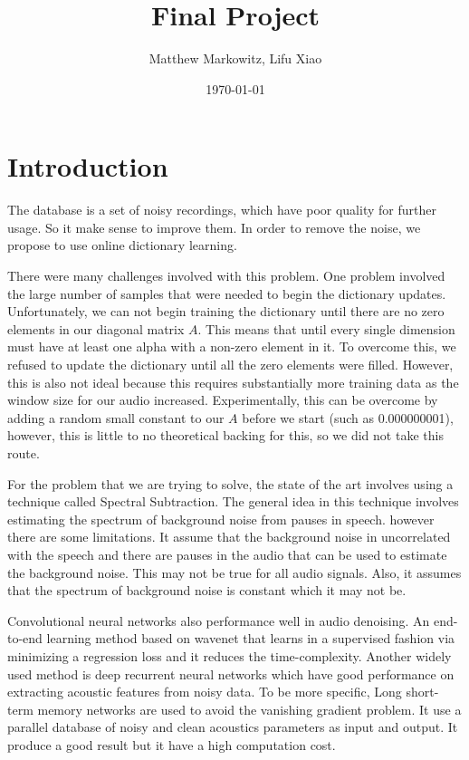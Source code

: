 \documentclass[UTF8]{article}
\title{Final Project}
\author{Matthew Markowitz, Lifu Xiao}
\date{\today}
\begin{document}
\maketitle


\section{Introduction}
The database is a set of noisy recordings, which have poor quality for further usage. So it make sense  to improve them. In order to remove the noise, we propose to use online dictionary learning.


There were many challenges involved with this problem. One problem involved the large number of samples that were needed to begin the dictionary updates. Unfortunately, we can not begin training the dictionary until there are no zero elements in our diagonal matrix $A$. This means that until every single dimension must have at least one alpha with a non-zero element in it. To overcome this, we refused to update the dictionary until all the zero elements were filled. However, this is also not ideal because this requires substantially more training data as the window size for our audio increased. Experimentally, this can be overcome by adding a random small constant to our $A$ before we start (such as 0.000000001), however, this is little to no theoretical backing for this, so we did not take this route.


For the problem that we are trying to solve, the state of the art involves using a technique called Spectral Subtraction\cite{upadhyay2015speech}. The general idea in this technique involves estimating the spectrum of background noise from pauses in speech. however there are some limitations. It assume that the background noise in uncorrelated with the speech and there are pauses in the audio that can be used to estimate the background noise. This may not be true for all audio signals. Also, it assumes that the spectrum of background noise is constant which it may not be.


Convolutional neural networks also performance well in audio denoising. An end-to-end learning method based on wavenet\cite{rethage2018wavenet} that learns in a supervised fashion via minimizing a regression loss and it reduces the time-complexity. Another widely used method is deep recurrent neural networks\cite{valentini2016speech} which have good performance on extracting acoustic features from noisy data. To be more specific, Long short-term memory networks are used to avoid the vanishing gradient problem. It use a parallel database of noisy and clean acoustics parameters as input and output. It produce a good result but it have a high computation cost.
\end{document}
